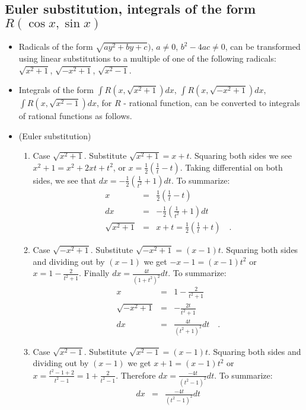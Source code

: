 \documentclass[12pt]{book}
\begin{document}
\subsection{Euler substitution, integrals of the form $R(\cos x, \sin x)$}\label{secEulerSubTrigIntegrals}
\begin{itemize}
\item   Radicals of the form  $\sqrt{ay^2+by+c})$, $a\neq 0$, $b^2-4ac\neq 0$, can be transformed using linear substitutions to a multiple of one of the following radicals: $\sqrt{x^2+1}$, $\sqrt{-x^2+1}$,  $\sqrt{x^2-1}$.
\item Integrals of the form $\int R(x, \sqrt{x^2+1})dx$, $\int R(x, \sqrt{-x^2+1})dx$, $\int R(x, \sqrt{x^2-1})dx$, for $R$ - rational function, can be converted to integrals of rational functions as follows.
\item (Euler substitution)
\begin{enumerate}
\item Case $\sqrt{x^2+1}$. Substitute $\sqrt{x^2+1}= x+t $. Squaring both sides we see $x^2+1=x^2+2xt+t^2$, or $x=\frac12\left(\frac{1}{t}- t\right)$. Taking differential on both sides, we see that $dx=-\frac12(\frac{1}{t^2}+1) dt$. To summarize:
\begin{equation}\label{eqEulerSub1}
\begin{array}{rcl}
x&=&\frac12\left(\frac{1}{t}- t\right)\\
dx&=&-\frac12(\frac{1}{t^2}+1) dt\\
\sqrt{x^2+1}&=&x+t= \frac12 \left(\frac1t +t\right) \quad .
\end{array}
\end{equation}
\item Case $\sqrt{-x^2+1}$. Substitute $\sqrt{-x^2+1}=(x-1)t$. Squaring both sides and dividing out by $(x-1)$ we get $-x-1=(x-1)t^2$ or $x=1-\frac{2}{t^2+1}$. Finally $dx=\frac{4t}{(1+t^2)^2}dt$. To summarize:
\[
\begin{array}{rcl}
x&=&1-\frac{2}{t^2+1}\\
\sqrt{-x^2+1}&=&-\frac{2t}{t^2+1}\\
dx&=&\frac{4t}{(t^2+1)^2}dt\quad .
\end{array}
\] 
\item Case $\sqrt{x^2-1} $. Substitute $\sqrt{x^2-1}=(x-1)t$. Squaring both sides and dividing out by $(x-1)$ we get $x+1=(x-1)t^2$ or $x=\frac{t^2-1+2}{t^2-1}= 1+\frac{2}{t^2-1}$. Therefore $dx=\frac{-4t}{(t^2-1)^2}dt$. To summarize:
\[
\begin{array}{rcl}
dx&=&\frac{-4t}{(t^2-1)^2}dt\\

\end{array}\]
\end{enumerate}
\end{itemize}
\end{document}
